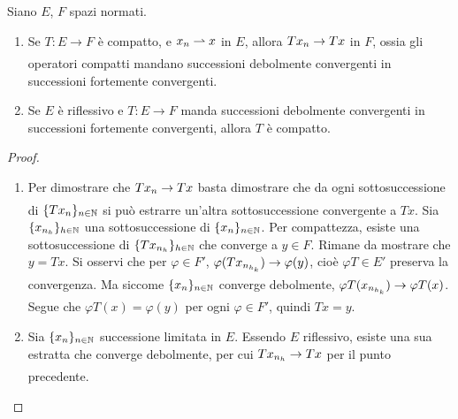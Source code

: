 \begin{theorem}
	Siano $E$, $F$ spazi normati.
	\begin{enumerate}
		\item Se $T:E \to F$ è compatto, e $x_n \rightharpoonup x$ in $E$, allora $Tx_n \underset{{}}{\rightarrow} Tx$ in $F$, ossia gli operatori compatti mandano successioni debolmente convergenti in successioni fortemente convergenti.
		\item Se $E$ è riflessivo e $T:E \to F$ manda successioni debolmente convergenti in successioni fortemente convergenti, allora $T$ è compatto.
	\end{enumerate}
\end{theorem}
\begin{proof}
	\leavevmode
	\begin{enumerate}
		\item Per dimostrare che $Tx_n \underset{{}}{\rightarrow} Tx$ basta dimostrare che da ogni sottosuccessione di $\{Tx_n\}_{n \in \mathbb{N}}$ si può estrarre un'altra sottosuccessione convergente a $Tx$.
		Sia $\{x_{n_h}\}_{h \in \mathbb{N}}$ una sottosuccessione di $\{x_n\}_{n \in \mathbb{N}}$. Per compattezza, esiste una sottosuccessione di $\{Tx_{n_h}\}_{h \in \mathbb{N}}$ che converge a $y \in F$. Rimane da mostrare che $y =Tx$. Si osservi che per $\varphi \in F'$, $\varphi(Tx_{n_{h_k}}) \underset{{}}{\rightarrow} \varphi(y)$, cioè $\varphi T \in E'$ preserva la convergenza. Ma siccome $\{x_n\}_{n \in \mathbb{N}}$ converge debolmente, $\varphi T(x_{n_{h_k}}) \underset{{}}{\rightarrow} \varphi T(x)$. Segue che $\varphi T(x) = \varphi(y)$ per ogni $\varphi \in F'$, quindi $Tx=y$.

		\item Sia $\{x_n\}_{n \in \mathbb{N}}$ successione limitata in $E$. Essendo $E$ riflessivo, esiste una sua estratta che converge debolmente, per cui $Tx_{n_h} \underset{{}}{\rightarrow} Tx$ per il punto precedente.
	\end{enumerate}
\end{proof}
